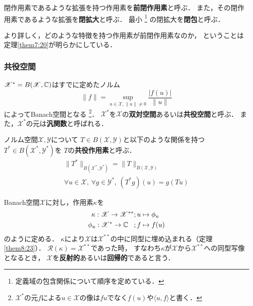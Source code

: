 \documentclass[a4j]{jarticle}
\newcommand{\range}{\mathscr{R}}
\newcommand{\spB}[2]{B(\mathscr{#1}, \mathscr{#2})}
\newcommand{\spX}{\mathscr{X}}
\newcommand{\spY}{\mathscr{Y}}
\begin{document}
    \begin{Def}
        閉作用素であるような拡張を持つ作用素を\textbf{前閉作用素}と呼ぶ．
        また，その閉作用素であるような拡張を\textbf{閉拡大}と呼ぶ．
        最小 \footnote{定義域の包含関係について順序を定めている．} の閉拡大を\textbf{閉包}と呼ぶ．
    \end{Def}
    より詳しく，どのような特徴を持つ作用素が前閉作用素なのか，
    ということは定理\ref{them7:20}が明らかにしている．

    \subsubsection{共役空間}
    \begin{Def}
        $\spX^{\ast}=B(\spX, \C)$はすでに定めたノルム
        \[ \|f\|=\sup_{u \in \spX, \| u \| \neq 0}{ \frac{|f(u)|}{\|u\|} } \]
        によってBanach空間となる
        \footnote{$\spX^{\ast}$の元$f$による$u \in \spX$の像は$fu$でなく$f(u)$や$\langle u,f \rangle$と書く．}．
        $\spX^{\ast}$を$\spX$の\textbf{双対空間}あるいは\textbf{共役空間}と呼ぶ．
        また，$\spX^{\ast}$の元は\textbf{汎関数}と呼ばれる．
    \end{Def}
    \begin{Def}
        ノルム空間$\spX, \spY$について
        $T \in \spB{X}{Y}$と以下のような関係を持つ$T^{\ast} \in \spB{X^{\ast}}{Y^{\ast}}$を
        $T$の\textbf{共役作用素}と呼ぶ．
        \begin{align*}
            \|T^{\ast}\|_{\spB{X^{\ast}}{Y^{\ast}}}=\|T\|_{\spB{X}{Y}} \\
            \forall u \in \spX,~ \forall g \in \mathscr{Y^{\ast}},~ (T^{\ast}g)(u)=g(Tu)
        \end{align*}
    \end{Def}
    \begin{Def}
        Banach空間$\spX$に対し，作用素$\kappa$を
        \begin{align*}
            \kappa: \spX \to \spX^{\ast \ast}     &;u \mapsto \phi_{u} \\
            \phi_u: \mathscr{X^{\ast}} \to \C \hspace{3truemm}&;f \mapsto f(u)
        \end{align*}
        のように定める．
        $\kappa$により$\spX$は$\spX^{\ast \ast}$の中に同型に埋め込まれる（定理\ref{them8:23}）．
        $\range(\kappa)=\spX^{\ast \ast}$であった時，
        すなわち$\kappa$が$\spX$から$\spX^{\ast \ast}$への同型写像となるとき，
        $\spX$を\textbf{反射的}あるいは\textbf{回帰的}であると言う．
    \end{Def}
\end{document}
